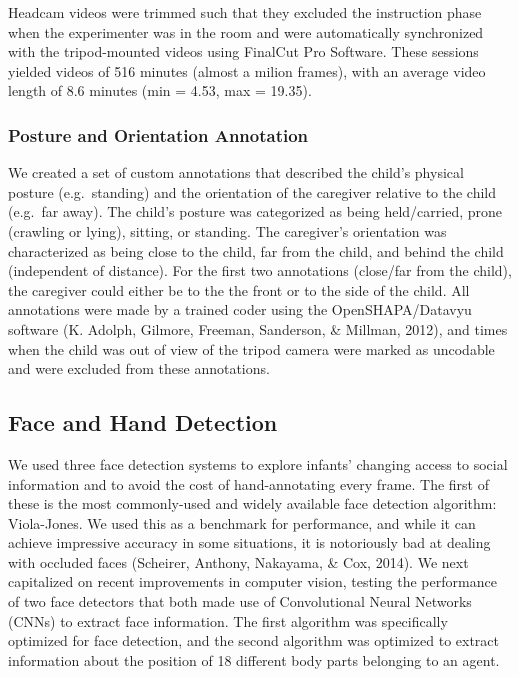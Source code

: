 \documentclass[10pt, letterpaper]{article}
\begin{document}
Headcam videos were trimmed such that they excluded the instruction
phase when the experimenter was in the room and were automatically
synchronized with the tripod-mounted videos using FinalCut Pro Software.
These sessions yielded videos of 516 minutes (almost a milion frames),
with an average video length of 8.6 minutes (min = 4.53, max = 19.35).

\subsubsection{Posture and Orientation
Annotation}\label{posture-and-orientation-annotation}

We created a set of custom annotations that described the child's
physical posture (e.g.~standing) and the orientation of the caregiver
relative to the child (e.g.~far away). The child's posture was
categorized as being held/carried, prone (crawling or lying), sitting,
or standing. The caregiver's orientation was characterized as being
close to the child, far from the child, and behind the child
(independent of distance). For the first two annotations (close/far from
the child), the caregiver could either be to the the front or to the
side of the child. All annotations were made by a trained coder using
the OpenSHAPA/Datavyu software (K. Adolph, Gilmore, Freeman, Sanderson,
\& Millman, 2012), and times when the child was out of view of the
tripod camera were marked as uncodable and were excluded from these
annotations.

\subsection{Face and Hand Detection}\label{face-and-hand-detection}

We used three face detection systems to explore infants' changing access
to social information and to avoid the cost of hand-annotating every
frame. The first of these is the most commonly-used and widely available
face detection algorithm: Viola-Jones. We used this as a benchmark for
performance, and while it can achieve impressive accuracy in some
situations, it is notoriously bad at dealing with occluded faces
(Scheirer, Anthony, Nakayama, \& Cox, 2014). We next capitalized on
recent improvements in computer vision, testing the performance of two
face detectors that both made use of Convolutional Neural Networks
(CNNs) to extract face information. The first algorithm was specifically
optimized for face detection, and the second algorithm was optimized to
extract information about the position of 18 different body parts
belonging to an agent.
\end{document}
